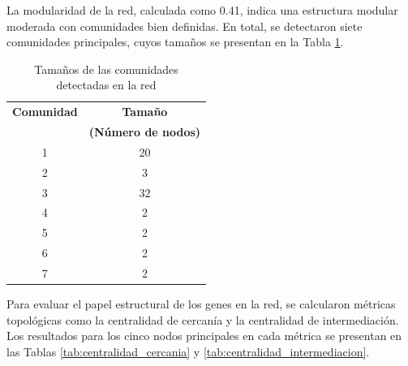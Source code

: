 La modularidad de la red, calculada como 0.41, indica una estructura modular moderada con comunidades bien definidas. En total, se detectaron siete comunidades principales, cuyos tamaños se presentan en la Tabla \ref{tab:modularidad_comunidades}.

\begin{table}[h!]
	\centering
	\caption{Tamaños de las comunidades detectadas en la red}
	\label{tab:modularidad_comunidades}
	\begin{tabular}{|c|c|}
		\hline
		\textbf{Comunidad} & \textbf{Tamaño} \\ 
		& \textbf{(Número de nodos)} \\ \hline
		1 & 20 \\ \hline
		2 & 3 \\ \hline
		3 & 32 \\ \hline
		4 & 2 \\ \hline
		5 & 2 \\ \hline
		6 & 2 \\ \hline
		7 & 2 \\ \hline
	\end{tabular}
\end{table}



Para evaluar el papel estructural de los genes en la red, se calcularon métricas topológicas como la centralidad de cercanía y la centralidad de intermediación. Los resultados para los cinco nodos principales en cada métrica se presentan en las Tablas \ref{tab:centralidad_cercania} y \ref{tab:centralidad_intermediacion}.

